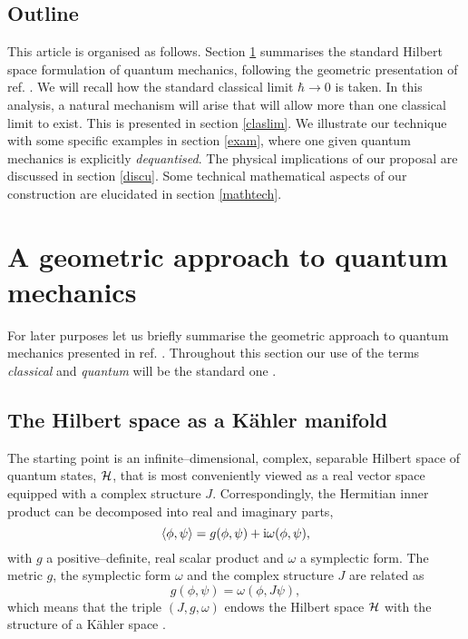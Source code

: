\documentclass[a4paper,a4paper]{article}
\begin{document}
\subsection{Outline}\label{outl}

This article is organised as follows. Section \ref{ast} summarises the standard Hilbert space 
formulation of quantum mechanics, following the geometric presentation of ref. \cite{ASHTEKAR}. 
We will recall how the standard classical limit $\hbar \to 0$ is taken. In this analysis, 
a natural mechanism will arise that will allow more than one classical limit to exist. 
This is presented in section \ref{claslim}. We illustrate our technique with some 
specific examples in section \ref{exam}, where one given quantum mechanics is explicitly 
{\it dequantised}. The physical implications of our proposal are discussed in section \ref{discu}. 
Some technical mathematical aspects of our construction are elucidated in section \ref{mathtech}.
 
\section{A geometric approach to quantum mechanics}\label{ast}

For later purposes let us briefly summarise the geometric approach to quantum mechanics 
presented in ref. \cite{ASHTEKAR}. Throughout this section our use of the terms {\it classical} 
and {\it quantum} will be the standard one \cite{GALINDO}.

\subsection{The Hilbert space as a K\"ahler manifold}\label{hika}

The starting point is an infinite--dimensional, complex, separable Hilbert space of quantum states, 
${\cal H}$, that is most conveniently viewed as a real vector space equipped with a complex 
structure $J$. Correspondingly, the Hermitian inner product can be decomposed into real and 
imaginary parts,
\begin{equation}
\langle\phi,\psi\rangle = g(\phi,\psi) + {\rm i}\omega(\phi,\psi),
\label{dec}
\end{equation}
with $g$ a positive--definite, real scalar product and $\omega$ a symplectic form.
The metric $g$, the symplectic form $\omega$ and the complex structure $J$ are related as
\begin{equation}
g(\phi,\psi)=\omega(\phi,J\psi),
\label{kah}
\end{equation}
which means that the triple $(J, g, \omega)$ endows the Hilbert space 
${\cal H}$ with the structure of a K\"ahler space \cite{ARNOLD}. 
\end{document}

